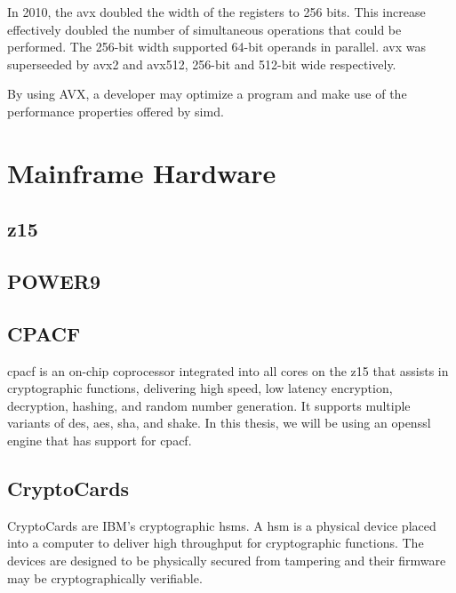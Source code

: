 In 2010, the \gls{avx} doubled the width of the registers to 256 bits. This increase effectively doubled the number of simultaneous operations that could be performed. The 256-bit width supported 64-bit operands in parallel\cite{hennessy2011:avx}. \gls{avx} was superseeded by \gls{avx2} and \gls{avx512}, 256-bit\cite{intel:avx2} and 512-bit\cite{intel:avx512} wide respectively.

By using AVX, a developer may optimize a program and make use of the performance properties offered by \gls{simd}\cite{hennessy2011:avx}.

\section{Mainframe Hardware}




\subsection{z15}

\subsection{POWER9}

\subsection{CPACF}
\gls{cpacf} is an on-chip coprocessor integrated into all cores on the z15 that assists in cryptographic functions, delivering high speed, low latency encryption, decryption, hashing, and random number generation. It supports multiple variants of \gls{des}, \gls{aes}, \gls{sha}, and \gls{shake}. In this thesis, we will be using an \gls{openssl} engine that has support for \gls{cpacf}.

\subsection{CryptoCards}

CryptoCards are IBM's cryptographic \glspl{hsm}. A \gls{hsm} is a physical device placed into a computer to deliver high throughput for cryptographic functions. The devices are designed to be physically secured from tampering and their firmware may be cryptographically verifiable\cite{ibm:hsms}.


